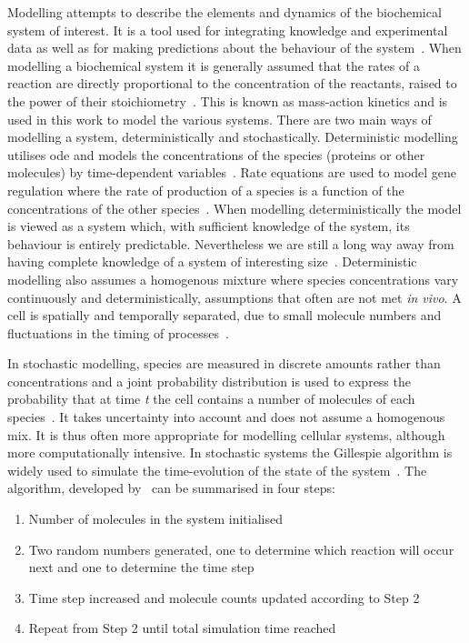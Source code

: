 Modelling attempts to describe the elements and dynamics of the biochemical system of interest. It is a tool used for integrating knowledge and experimental data as well as for making predictions about the behaviour of the system~\autocite{wilkinson:2006}. When modelling a biochemical system it is generally assumed that the rates of a reaction are directly proportional to the concentration of the reactants, raised to the power of their stoichiometry~\autocite{wilkinson:2006}. This is known as mass-action kinetics and is used in this work to model the various systems.  
There are two main ways of modelling a system, deterministically and stochastically. Deterministic modelling utilises \acrfull{ode} and models the concentrations of the species (proteins or other molecules) by time-dependent variables~\autocite{deJong:2002ft}. Rate equations are used to model gene regulation where the rate of production of a species is a function of the concentrations of the other species~\autocite{deJong:2002ft}. When modelling deterministically the model is viewed as a system which, with sufficient knowledge of the system, its behaviour is entirely predictable. Nevertheless we are still a long way away from having complete knowledge of a system of interesting size~\autocite{wilkinson:2006}. Deterministic modelling also assumes a homogenous mixture where species concentrations vary continuously and deterministically, assumptions that often are not met \textit{in vivo}. A cell is spatially and temporally separated, due to small molecule numbers and fluctuations in the timing of processes~\autocite{deJong:2002ft}.  
   
In stochastic modelling, species are measured in discrete amounts rather than concentrations and a joint probability distribution is used to express the probability that at time \textit{t} the cell contains a number of molecules of each species~\autocite{deJong:2002ft}. It takes uncertainty into account and does not assume a homogenous mix. It is thus often more appropriate for modelling cellular systems, although more computationally intensive. In stochastic systems the Gillespie algorithm is widely used to simulate the time-evolution of the state of the system~\autocite{wilkinson:2006}. The algorithm, developed by~\textcite{Gillespie:1977ww} can be summarised in four steps:

\begin{enumerate}
\item Number of molecules in the system initialised
\item Two random numbers generated, one to determine which reaction will occur next and one to determine the time step
\item Time step increased and molecule counts updated according to Step 2 
\item Repeat from Step 2 until total simulation time reached
\end{enumerate}
   
